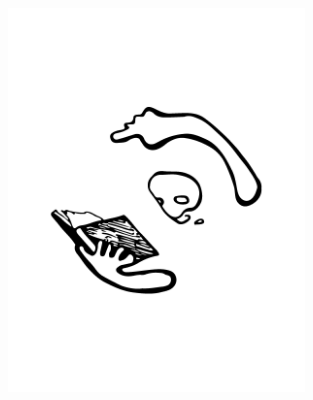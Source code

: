 \documentclass[twoside]{article}
\begin{document}
  \thispagestyle{empty} \mbox{}
  \newpage %
  \vspace*{2.25in}
  \begin{center}
    \includegraphics[height=4in]{title_image_black.png}
  \end{center}
  \vspace*{\fill}
\end{document}
